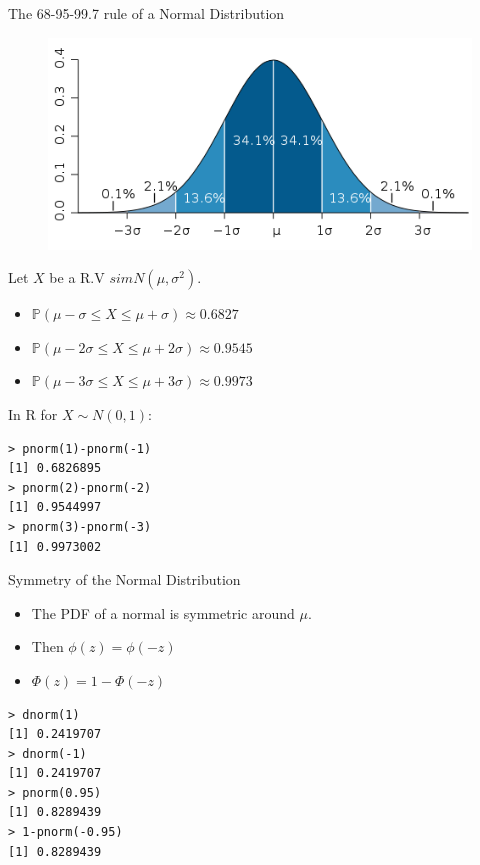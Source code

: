 \documentclass[handout]{beamer}
\begin{document}
\begin{frame}[fragile]{The 68-95-99.7 rule of a Normal Distribution}
\scriptsize{
\begin{figure}[h!]
	\centering
	\includegraphics[scale=0.3]{pics/gaussian.png}
\end{figure} 
Let $X$ be a R.V $sim N(\mu,\sigma^2)$.
\begin{itemize}
 \item $\mathbb{P}( \mu - \sigma \leq X \leq \mu+ \sigma) \approx 0.6827$  
 \item $\mathbb{P}( \mu - 2 \sigma \leq X \leq \mu+ 2 \sigma) \approx 0.9545$               
 \item $\mathbb{P}( \mu - 3 \sigma \leq X \leq \mu+ 3 \sigma) \approx 0.9973$ 

\end{itemize}
In R for $X\sim N(0,1)$:
\begin{verbatim}
> pnorm(1)-pnorm(-1)
[1] 0.6826895
> pnorm(2)-pnorm(-2)
[1] 0.9544997
> pnorm(3)-pnorm(-3)
[1] 0.9973002 
\end{verbatim}
}
\end{frame}

\begin{frame}[fragile]{Symmetry of the Normal Distribution}
\begin{itemize}
 \item The PDF of a normal is symmetric around $\mu$.
 \item Then $\phi(z)= \phi(-z) $ 
 \item $\Phi(z)=1-\Phi(-z)$
\end{itemize}
\begin{verbatim}
> dnorm(1)
[1] 0.2419707
> dnorm(-1)
[1] 0.2419707
> pnorm(0.95)
[1] 0.8289439
> 1-pnorm(-0.95)
[1] 0.8289439 
\end{verbatim}


\end{frame}
\end{document}
